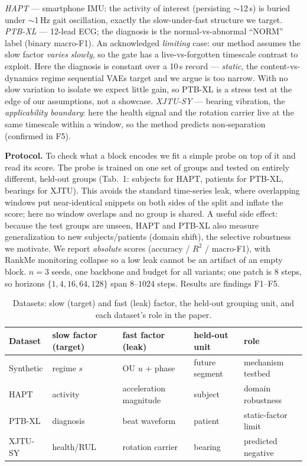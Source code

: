 \documentclass[10pt,twocolumn]{article}
\begin{document}
\emph{HAPT} \cite{reyes2016transition} --- smartphone IMU: the activity of
interest (persisting $\sim$12\,s) is buried under $\sim$1\,Hz gait
oscillation, exactly the slow-under-fast structure we target.
\emph{PTB-XL} \cite{wagner2020ptb} --- 12-lead ECG; the diagnosis is the
normal-vs-abnormal ``NORM'' label (binary macro-F1). An acknowledged
\emph{limiting} case: our method assumes the slow factor \emph{varies slowly},
so the gate has a live-vs-forgotten timescale contrast to exploit. Here the
diagnosis is constant over a 10\,s record --- \emph{static}, the
content-vs-dynamics regime sequential VAEs target and we argue is too narrow.
With no slow variation to isolate we expect little gain, so PTB-XL is a stress
test at the edge of our assumptions, not a showcase.
\emph{XJTU-SY} \cite{wang2020xjtu} --- bearing vibration, the
\emph{applicability boundary}: here the health signal and the rotation carrier
live at the same timescale within a window, so the method predicts
non-separation (confirmed in F5).

\textbf{Protocol.} To check what a block encodes we fit a simple probe on top
of it and read its score. The probe is trained on one set of groups and
tested on entirely different, held-out groups (Tab.~1: subjects for HAPT,
patients for PTB-XL, bearings for XJTU). This avoids the standard time-series
leak, where overlapping windows put near-identical snippets on both sides of
the split and inflate the score; here no window overlaps and no group is
shared. A useful side effect: because the test groups are unseen, HAPT and
PTB-XL also measure generalization to new subjects/patients (domain shift),
the selective robustness we motivate. We report \emph{absolute} scores
(accuracy / $R^2$ / macro-F1), with RankMe \cite{garrido2023rankme} monitoring
collapse so a low leak cannot be an artifact of an empty block. $n{=}3$ seeds, one backbone and budget for all
variants; one patch is 8 steps, so horizons $\{1{,}4{,}16{,}64{,}128\}$ span
$8$--$1024$ steps. Results are findings F1--F5.

\begin{table}[t]
\centering\small
\caption{\small Datasets: slow (target) and fast (leak) factor, the held-out
grouping unit, and each dataset's role in the paper.}
\begin{tabular}{@{}lllll@{}}
\toprule
Dataset & slow factor (target) & fast factor (leak) & held-out unit & role \\
\midrule
Synthetic & regime $s$ & OU $u$ + phase & future segment & mechanism testbed \\
HAPT & activity & acceleration magnitude & subject & domain robustness \\
PTB-XL & diagnosis & beat waveform & patient & static-factor limit \\
XJTU-SY & health/RUL & rotation carrier & bearing & predicted negative \\
\bottomrule
\end{tabular}
\end{table}
\end{document}
